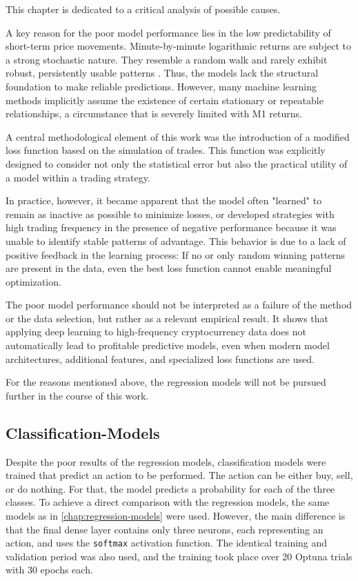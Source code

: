 This chapter is dedicated to a critical analysis of possible causes.

A key reason for the poor model performance lies in the low predictability of short-term price movements.
Minute-by-minute logarithmic returns are subject to a strong stochastic nature.
They resemble a random walk and rarely exhibit robust, persistently usable patterns \cite{random-walk}.
Thus, the models lack the structural foundation to make reliable predictions.
However, many machine learning methods implicitly assume the existence of certain stationary or repeatable relationships, a circumstance that is severely limited with M1 returns.

A central methodological element of this work was the introduction of a modified loss function based on the simulation of trades.
This function was explicitly designed to consider not only the statistical error but also the practical utility of a model within a trading strategy.

In practice, however, it became apparent that the model often "learned" to remain as inactive as possible to minimize losses, or developed strategies with high trading frequency in the presence of negative performance because it was unable to identify stable patterns of advantage.
This behavior is due to a lack of positive feedback in the learning process: If no or only random winning patterns are present in the data, even the best loss function cannot enable meaningful optimization.

The poor model performance should not be interpreted as a failure of the method or the data selection, but rather as a relevant empirical result.
It shows that applying deep learning to high-frequency cryptocurrency data does not automatically lead to profitable predictive models, even when modern model architectures, additional features, and specialized loss functions are used.

For the reasons mentioned above, the regression models will not be pursued further in the course of this work.

\subsection{Classification-Models}
\label{chap:classification-models}

Despite the poor results of the regression models, classification models were trained that predict an action to be performed.
The action can be either buy, sell, or do nothing.
For that, the model predicts a probability for each of the three classes.
To achieve a direct comparison with the regression models, the same models as in \autoref{chap:regression-models} were used.
However, the main difference is that the final dense layer contains only three neurons, each representing an action, and uses the
\verb|softmax| activation function.
The identical training and validation period was also used, and the training took place over 20 Optuna trials with 30 epochs each.

